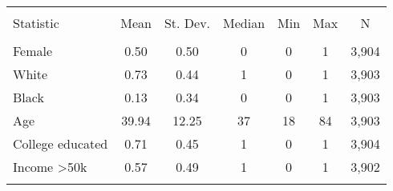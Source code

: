 
\begin{tabular}{@{\extracolsep{5pt}}lcccccc} 
\\[-1.8ex]\hline 
\hline \\[-1.8ex] 
Statistic & \multicolumn{1}{c}{Mean} & \multicolumn{1}{c}{St. Dev.} & \multicolumn{1}{c}{Median} & \multicolumn{1}{c}{Min} & \multicolumn{1}{c}{Max} & \multicolumn{1}{c}{N} \\ 
\hline \\[-1.8ex] 
Female & 0.50 & 0.50 & 0 & 0 & 1 & 3,904 \\ 
White & 0.73 & 0.44 & 1 & 0 & 1 & 3,903 \\ 
Black & 0.13 & 0.34 & 0 & 0 & 1 & 3,903 \\ 
Age & 39.94 & 12.25 & 37 & 18 & 84 & 3,903 \\ 
College educated & 0.71 & 0.45 & 1 & 0 & 1 & 3,904 \\ 
Income \textgreater 50k & 0.57 & 0.49 & 1 & 0 & 1 & 3,902 \\ 
\hline \\[-1.8ex] 
\end{tabular} 
